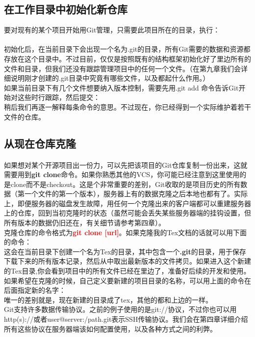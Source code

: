 \documentclass{book}
\begin{document}
	\subsection{在工作目录中初始化新仓库}
	要对现有的某个项目开始用Git管理，只需要此项目所在的目录，执行：\\
	\\
	初始化后，在当前目录下会出现一个名为.git的目录，所有Git需要的数据和资源都存放在这个目录中。不过目前，仅仅是按照既有的结构框架初始化好了里边所有的文件和目录，但我们还没有跟踪管理项目中的任何一个文件。（在第九章我们会详细说明刚才创建的.git目录中究竟有哪些文件，以及都起什么作用。）\\

	如果当前目录下有几个文件想要纳入版本控制，需要先用.git add 命令告诉Git开始对这些时行跟踪，然后提交：\\
	稍后我们再逐一解释每条命令的意思。不过现在，你已经得到一个实际维护着若干文件的仓库。\\
	
	\subsection{从现在仓库克隆}
	\paragraph{}
	如果想对某个开源项目出一份力，可以先把该项目的Git仓库复制一份出来，这就需要用到\textbf{git clone}命令。如果你熟悉其他的VCS，你可能已经注意到这里使用的是clone而不是checkout。这是个非常重要的差别，Git收取的是项目历史的所有数据（第一个文件的第一个版本），服务器上有的数据克隆之后本地也都有了。实际上，即便服务器的磁盘发生故障，用任何一个克隆出来的客户端都可以重建服务器上的仓库，回到当初克隆时的状态（虽然可能会丢失某些服务器端的挂钩设置，但所有版本的数据仍旧还在，有关细节请参考第四章）。\\
	克隆仓库的命令格式为\textcolor{red}{\textbf{git clone [url]}}。如果克隆我的Tex文档的话就可以用下面的命令：\\
	这会在当前目录下创建一个名为Tex的目录，其中包含一个\textbf{.git}的目录，用于保存下载下来的所有版本记录，然后从中取出最新版本的文件拷贝。如果进入这个新建的Tex目录,你会看到项目中的所有文件已经在里边了，准备好后续的开发和使用。如果希望在克隆的时候，自己定义要新建的项目目录的名称，可以用上面的命令在后面指定新的名字：\\
	唯一的差别就是，现在新建的目录成了tex，其他的都和上边的一样。\\
	Git支持许多数据传输协议。之前的例子使用的是git://协议，不过你也可以用http(s)://或者user@server:/path.git表示SSH传输协议。我们会在第四章详细介绍所有这些协议在服务器端该如何配置使用，以及各种方式之间的利弊。\\
\end{document}
